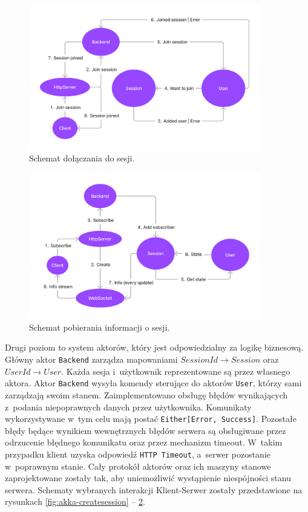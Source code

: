 \begin{figure}[hp!]
  \centering
  \includegraphics[width=0.9\textwidth]{img/akka/JoinSession.png}
  \caption{Schemat dołączania do sesji.}
  \label{fig:akka-joinsession}
\end{figure}

\begin{figure}[hp!]
  \centering
  \includegraphics[width=0.9\textwidth]{img/akka/SessionInfo.png}
  \caption{Schemat pobierania informacji o sesji.}
  \label{fig:akka-sessioninfo}
\end{figure}

Drugi poziom to system aktorów, który jest
odpowiedzialny za logikę biznesową.
Główny aktor \verb|Backend| zarządza mapowaniami
$SessionId \to Session$ oraz $UserId \to User$.
Każda sesja i~użytkownik reprezentowane są
przez własnego aktora.
Aktor \verb|Backend| wysyła komendy sterujące do
aktorów \verb|User|, którzy sami zarządzają swoim stanem.
Zaimplementowano obsługę błędów wynikających z~podania
niepoprawnych danych przez użytkownika.
Komunikaty wykorzystywane w~tym celu mają postać
\verb|Either[Error, Success]|.
Pozostałe błędy będące wynikiem wewnętrznych błędów
serwera są obsługiwane przez odrzucenie błędnego
komunikatu oraz przez mechanizm timeout.
W~takim przypadku klient uzyska odpowiedź
\verb|HTTP Timeout|, a~serwer pozostanie w~poprawnym stanie.
Cały protokół aktorów oraz ich maszyny stanowe zaprojektowane
zostały tak, aby uniemożliwić wystąpienie niespójności stanu serwera.
Schematy wybranych interakcji Klient-Serwer zostały przedstawione
na rysunkach \ref{fig:akka-createsession} -- \ref{fig:akka-sessioninfo}.

